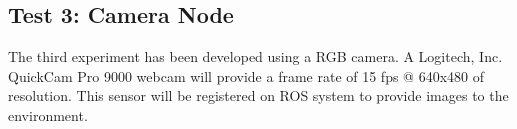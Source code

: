 \documentclass[journal,twoside]{JoPhA}
\begin{document}



% 
% 



\subsection{Test 3: Camera Node}


The third experiment has been developed using a RGB camera. A Logitech, Inc. QuickCam Pro 9000 webcam will provide a frame rate of 15 fps @ 640x480 of resolution. This sensor will be registered on ROS system to provide images to the environment.
\end{document}
